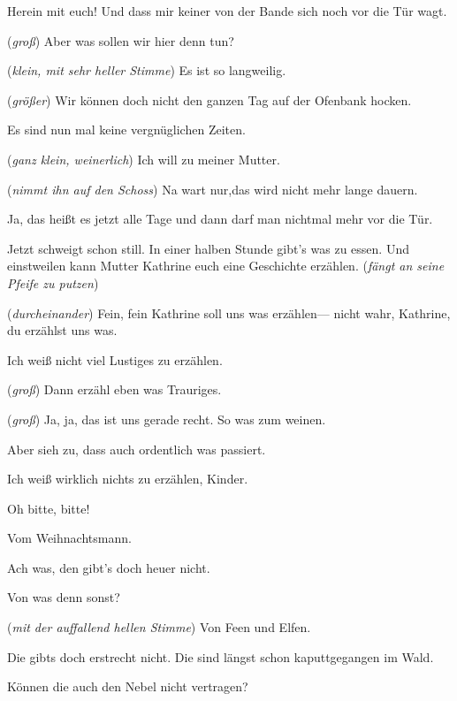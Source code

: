 \documentclass[
	final,
	a4paper,
	ngerman,
	mpinclude = true, %
	twoside = true,
	open = right,
	cleardoublepage = plain,
	DIV = 13,
	BCOR = 1cm,
	titlepage = firstiscover,
	]{scrbook}
\newcommand{\direction}[1]{(\textit{#1})}
\newcommand{\thecharacter}[1]{\textup{\textsc{#1}}\xspace}
\newcommand{\theJosef}{\thecharacter{Josef}}
\newcommand{\theKathrine}{\thecharacter{Kathrine}}
\newcommand{\theKinder}{\thecharacter{Kinder}}
\newcommand{\character}[1]{\item[#1]}
\newcommand{\Josef}{\character{\theJosef}}
\newcommand{\Kathrine}{\character{\theKathrine}}
\newcommand{\Kinder}{\character{\theKinder}}
\newcommand{\Junge}[1]{\character{Junge #1}}
\newcommand{\Maedchen}[1]{\character{Mädchen #1}}
\begin{document}
\begin{play}

\Josef
Herein mit euch! Und dass mir keiner von der Bande sich noch vor die Tür wagt.

\Junge{1}
\direction{groß}
Aber was sollen wir hier denn tun?

\Maedchen{1}
\direction{klein, mit sehr heller Stimme} Es ist so langweilig.

\Maedchen{2}
\direction{größer}
Wir können doch nicht den ganzen Tag auf der Ofenbank hocken.

\Josef
Es sind nun mal keine vergnüglichen Zeiten.

\Junge{2}
\direction{ganz klein, weinerlich} Ich will  zu meiner Mutter.

\Josef
\direction{nimmt ihn auf den Schoss} Na wart nur,das wird nicht mehr lange dauern.

\Junge{1}
Ja, das heißt es jetzt alle Tage und dann darf man nichtmal mehr vor die Tür.

\Josef
Jetzt schweigt schon still. In einer halben Stunde gibt's was zu essen. Und einstweilen kann Mutter Kathrine euch eine Geschichte erzählen. \direction{fängt an seine Pfeife zu putzen}

\Kinder
\direction{durcheinander} Fein, fein Kathrine soll uns was erzählen--- nicht wahr, Kathrine, du erzählst uns was.

\Kathrine
Ich weiß nicht viel Lustiges zu erzählen.

\Maedchen{1}
\direction{groß}
Dann erzähl eben was Trauriges.

\Maedchen{2}
\direction{groß}
Ja, ja, das ist uns gerade recht. So was zum weinen.

\Junge{3}
Aber sieh zu, dass auch ordentlich was passiert.

\Kathrine
Ich weiß wirklich nichts zu erzählen, Kinder.

\Kinder
Oh bitte, bitte!

\Maedchen{2}
Vom Weihnachtsmann.

\Junge{3}
Ach was, den gibt's doch heuer nicht.

\Maedchen{3}
Von was denn sonst?

\Maedchen{1}
\direction{mit der auffallend hellen Stimme} Von Feen und Elfen.

\Junge{1}
Die gibts doch erstrecht nicht. Die sind längst schon kaputtgegangen im Wald.

\Maedchen{1}
Können die auch den Nebel nicht vertragen?


\end{play}
\end{document}
